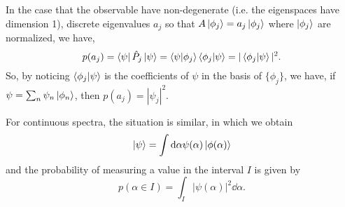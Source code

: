 \documentclass[]{article}
\theoremstyle{definition}
\theoremstyle{definition}
\begin{document}
In the case that the observable have non-degenerate (i.e. the eigenspaces have 
dimension 1), discrete eigenvalues \(a_j\) so that 
\(A\ket{\phi_j} = a_j \ket{\phi_j}\) where \(\ket{\phi_j}\) are normalized, 
we have, 
\[p(a_j) = \bra{\psi} \hat P_j \ket{\psi} = 
  \bra{\psi}\ket{\phi_j}\bra{\phi_j}\ket{\psi} = 
  |\bra{\phi_j}\ket{\psi}|^2.\]
So, by noticing \(\bra{\phi_j}\ket{\psi}\) is the coefficients of \(\psi\) 
in the basis of \(\{\phi_j\}\), we have, if \(\psi = \sum_n \psi_n \ket{\phi_n}\), 
then \(p(a_j) = |\psi_j|^2\). 

For continuous spectra, the situation is similar, in which we obtain 
\[\ket{\psi} = \int \dd \alpha \psi(\alpha) \ket{\phi(\alpha)}\]
and the probability of measuring a value in the interval \(I\) is given by 
\[p(\alpha \in I) = \int_I |\psi(\alpha)|^2 \dd \alpha.\]
\end{document}
